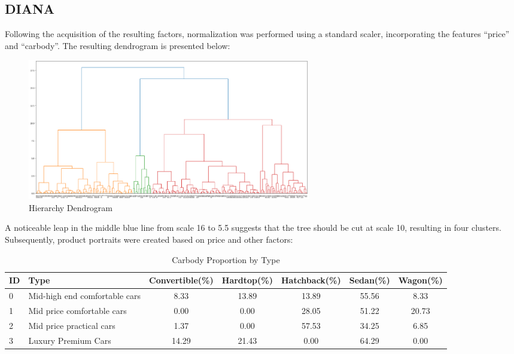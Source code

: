\documentclass{article}
\begin{document}
\subsection{DIANA}
Following the acquisition of the resulting factors, normalization was performed using a standard scaler, incorporating the features ``price'' and ``carbody''.
The resulting dendrogram is presented below:
\begin{figure}[H]
    \centering
    \includegraphics[width=0.6\textwidth]{image/paper/link_tree.png}
    \caption{Hierarchy Dendrogram}
    \label{tree}
\end{figure}
A noticeable leap in the middle blue line from scale 16 to 5.5 suggests that the tree should be cut at scale 10, resulting in four clusters.
Subsequently, product portraits were created based on price and other factors:

\begin{table}[H]
    \centering
    \caption{Carbody Proportion by Type}
    \small
    \begin{tabular}{llccccc}
        \toprule
        \textbf{ID} & \textbf{Type}                 & \textbf{Convertible(\%)} & \textbf{Hardtop(\%)} & \textbf{Hatchback(\%)} & \textbf{Sedan(\%)} & \textbf{Wagon(\%)} \\
        \midrule
        0           & Mid-high end comfortable cars & 8.33                     & 13.89                & 13.89                  & 55.56              & 8.33               \\
        1           & Mid price comfortable cars    & 0.00                     & 0.00                 & 28.05                  & 51.22              & 20.73              \\
        2           & Mid price practical cars      & 1.37                     & 0.00                 & 57.53                  & 34.25              & 6.85               \\
        3           & Luxury Premium Cars           & 14.29                    & 21.43                & 0.00                   & 64.29              & 0.00               \\
        \bottomrule
    \end{tabular}
\end{table}
\end{document}
